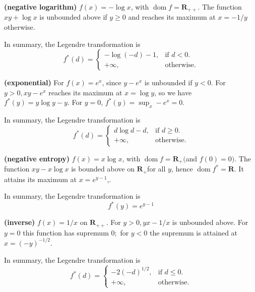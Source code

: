 \documentclass{article}
\newcommand{\bfs}[1]{\textbf{({#1}) }}
\begin{document}
\begin{exma}\bfs{negative logarithm}
$f(x)=-\log x$, with $\operatorname{dom} f=\mathbf{R}_{++} .$ 
The function $x y+\log x$ is unbounded above if $y \geq 0$ and reaches its maximum at $x=-1 / y$ otherwise. 

In summary, the Legendre transformation  is 
\begin{equation}
  f^*(d)=\begin{cases}
    -\log (-d)-1, & \text{if $d<0$}.\\
    +\infty, & \text{otherwise}.
  \end{cases}
\end{equation}
\end{exma} 
\begin{exma}\bfs{exponential}
For $f(x)=e^{x}$, since $y-e^{x}$ is unbounded if $y<0$. For $y>0, x y-e^{x}$ reaches its maximum at $x=\log y$, so we have $f^{*}(y)=y \log y-y .$ For $y=0$, $f^{*}(y)=\sup _{x}-e^{x}=0 .$  

In summary, the Legendre transformation  is 
\begin{equation}
  f^*(d)=\begin{cases}
    d\log d-d, & \text{if $d\ge 0$}.\\
    +\infty, & \text{otherwise}.
  \end{cases}
\end{equation}
\end{exma}
 \begin{exma}\bfs{negative entropy}
 $f(x)=x \log x$, with $\operatorname{dom} f=\mathbf{R}_{+}($and $f(0)=0)$. The function $x y-x \log x$ is bounded above on $\mathbf{R}_{+}$for all $y$, hence $\operatorname{dom} f^{*}=\mathbf{R}$. It attains its maximum at $x=e^{y-1}$,.
 
 In summary, the Legendre transformation  is 
 $$f^{*}(y)=e^{y-1}$$
 \end{exma}
\begin{exma}\bfs{inverse}
$f(x)=1 / x$ on $\mathbf{R}_{++}$. For $y>0, y x-1 / x$ is unbounded above. For $y=0$ this function has supremum $0 ;$ for $y<0$ the supremum is attained at $x=(-y)^{-1 / 2} .$ 

In summary, the Legendre transformation  is 
\begin{equation}
  f^*(d)=\begin{cases}
    -2(-d)^{1 / 2}, & \text{if $d\le 0$}.\\
    +\infty, & \text{otherwise}.
  \end{cases}
\end{equation}
\end{exma} 
\end{document}
